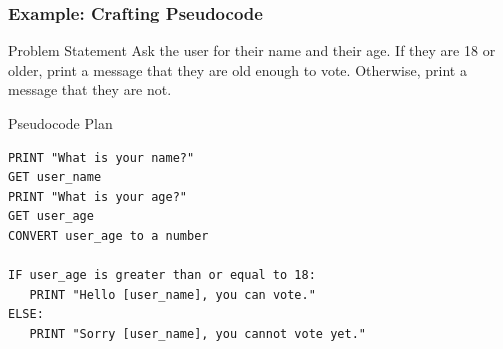 \documentclass{beamer}
\begin{document}
\begin{frame}[fragile]
    \frametitle{Example: Crafting Pseudocode}
    \begin{block}{Problem Statement}
        Ask the user for their name and their age. If they are 18 or older, print a message that they are old enough to vote. Otherwise, print a message that they are not.
    \end{block}

    \vspace{1em}
    \begin{block}{Pseudocode Plan}
\begin{verbatim}
PRINT "What is your name?"
GET user_name
PRINT "What is your age?"
GET user_age
CONVERT user_age to a number

IF user_age is greater than or equal to 18:
   PRINT "Hello [user_name], you can vote."
ELSE:
   PRINT "Sorry [user_name], you cannot vote yet."
\end{verbatim}
    \end{block}
\end{frame}
\end{document}
